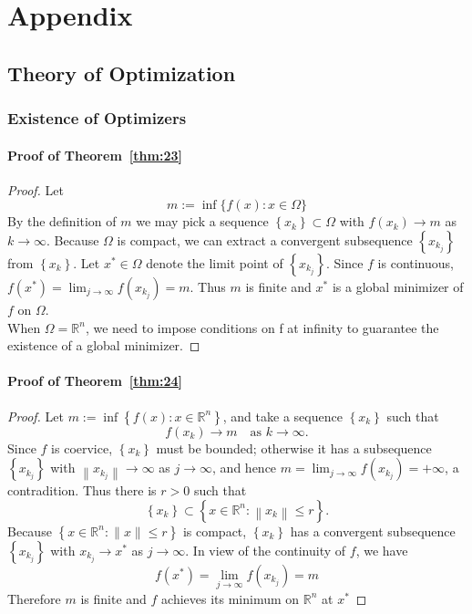 \chapter{Appendix}
\renewcommand{\thesection}{\Alph{section}}
\label{appendix}
\section{Theory of Optimization}
\subsection{Existence of Optimizers}

\subsubsection{Proof of Theorem~\ref{thm:23}}
\label{appendix:trm23}
\begin{proof}
Let 
$$
m:=\inf \{f(x): x \in \Omega\}
$$
By the definition of $m$ we may pick a sequence $\left\{x_{k}\right\} \subset \Omega$ with $f\left(x_{k}\right) \rightarrow m$ as $k \rightarrow \infty$. Because $\Omega$ is compact, we can extract a convergent subsequence $\left\{x_{k_j}\right\}$ from $\left\{x_{k}\right\}$. Let $x^{*} \in \Omega$ denote the limit point of $\left\{x_{k_j}\right\}$. Since $f$ is continuous, $f\left(x^{*}\right)=\lim _{j \rightarrow \infty} f\left(x_{k_{j}}\right)=m$. Thus $m$ is finite and $x^{*}$ is a global minimizer of $f$ on $\Omega$. \\
When $\Omega = \mathbb{R}^n$, we need to impose conditions on f at infinity to guarantee the existence of a global minimizer.
\end{proof}

\subsubsection{Proof of Theorem~\ref{thm:24}}
\label{appendix:trm24}
\begin{proof}
Let $m:=\inf \left\{f(x): x \in \mathbb{R}^{n}\right\}$, and take a sequence $\left\{x_{k}\right\}$ such that 
$$
f\left(x_{k}\right) \rightarrow m \quad \textrm{as }  k \rightarrow \infty .
$$
Since $f$ is coervice, $\left\{x_{k}\right\}$ must be bounded; otherwise it has a subsequence $\left\{x_{k_j}\right\}$ with $\left\|x_{k_{j}}\right\| \rightarrow \infty$ as $j \rightarrow \infty$, and hence $m=\lim _{j \rightarrow \infty} f\left(x_{k_{j}}\right)=+\infty$, a contradition. 
Thus there is $r > 0$ such that
$$
\left\{x_{k}\right\} \subset\left\{x \in \mathbb{R}^{n}:\left\|x_{k}\right\| \leq r\right\}.
$$
Because $\left\{x \in \mathbb{R}^{n}:\|x\| \leq r\right\}$ is compact, $\left\{x_{k}\right\}$ has a convergent subsequence $\left\{x_{k_j}\right\}$ with $x_{k_{j}} \rightarrow x^{*}$ as $j \rightarrow \infty$. In view of the continuity of $f$, we have 
$$
f\left(x^{*}\right)=\lim _{j \rightarrow \infty} f\left(x_{k_{j}}\right)=m
$$
Therefore $m$ is finite and $f$ achieves its minimum on $\mathbb{R}^n$ at $x^{*}$
\end{proof}
